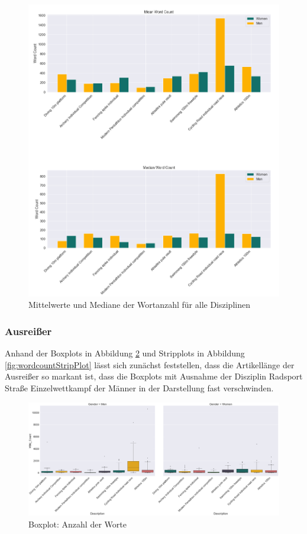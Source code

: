 \documentclass[11pt]{article}
\begin{document}
\begin{figure}
\includegraphics[width=1\textwidth]{figures/wordcount_mean_median.png}
\caption[Mittelwerte und Mediane der Wortanzahl für alle Disziplinen]{Mittelwerte und Mediane der Wortanzahl für alle Disziplinen}
\label{fig:wordcountMeanMedian}
\end{figure}

\subsubsection{Ausreißer}

Anhand der Boxplots in Abbildung \ref{fig:wordcountBoxPlot} und Stripplots in Abbildung \ref{fig:wordcountStripPlot} lässt sich zunächst feststellen, dass die Artikellänge der Ausreißer so markant ist, dass die Boxplots mit Ausnahme der Disziplin Radsport Straße Einzelwettkampf der Männer in der Darstellung fast verschwinden.

\begin{figure}
\includegraphics[width=1\textwidth]{figures/wordcount_boxplot.png}
\caption[Boxplot: Anzahl der Worte]{Boxplot: Anzahl der Worte}
\label{fig:wordcountBoxPlot}
\end{figure}
\end{document}
